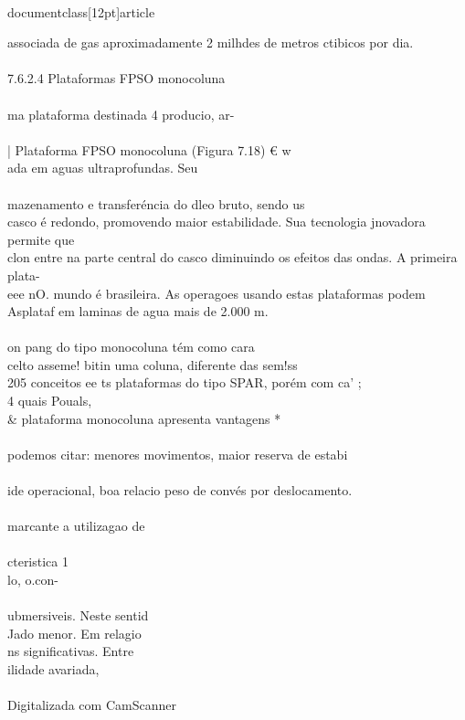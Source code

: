 \\documentclass[12pt]{article}
\begin{document}
associada de gas aproximadamente 2 milhdes de metros ctibicos por dia.\\
\\
7.6.2.4 Plataformas FPSO monocoluna\\
\\
ma plataforma destinada 4 producio, ar-\\
\\
| Plataforma FPSO monocoluna (Figura 7.18) € w\\
ada em aguas ultraprofundas. Seu\\
\\
mazenamento e transferéncia do dleo bruto, sendo us\\
casco é redondo, promovendo maior estabilidade. Sua tecnologia jnovadora permite que\\
clon entre na parte central do casco diminuindo os efeitos das ondas. A primeira plata-\\
eee nO. mundo é brasileira. As operagoes usando estas plataformas podem\\
Asplataf em laminas de agua mais de 2.000 m.\\
\\
on pang do tipo monocoluna tém como cara\\
celto asseme! bitin uma coluna, diferente das sem!ss\\
205 conceitos ee ts plataformas do tipo SPAR, porém com ca’ ;\\
4 quais Pouals, \\& plataforma monocoluna apresenta vantagens *\\
\\
 podemos citar: menores movimentos, maior reserva de estabi\\
\\
ide operacional, boa relacio peso de convés por deslocamento.\\
\\
marcante a utilizagao de\\
\\
cteristica 1\\
lo, o.con-\\
\\
ubmersiveis. Neste sentid\\
Jado menor. Em relagio\\
ns significativas. Entre\\
ilidade avariada,\\
\\
Digitalizada com CamScanner\\
\end{document}
